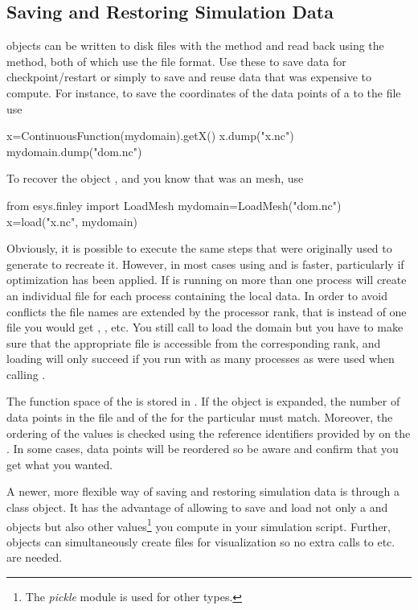 \subsection{Saving and Restoring Simulation Data}
\Data objects can be written to disk files with the  method and
read back using the  method, both of which use the
\netCDF\cite{NETCDF} file format.
Use these to save data for checkpoint/restart or simply to save and reuse data
that was expensive to compute.
For instance, to save the coordinates of the data points of a
\ContinuousFunction to the file  use
\begin{python}
  x=ContinuousFunction(mydomain).getX()
  x.dump("x.nc")
  mydomain.dump("dom.nc")
\end{python}
To recover the object , and you know that  was an \finley
mesh, use
\begin{python}
  from esys.finley import LoadMesh
  mydomain=LoadMesh("dom.nc")
  x=load("x.nc", mydomain)
\end{python}
Obviously, it is possible to execute the same steps that were originally used
to generate  to recreate it. However, in most cases using
 and  is faster, particularly if optimization has
been applied.
If \escript is running on more than one \MPI process  will create
an individual file for each process containing the local data.
In order to avoid conflicts the file names are extended by the \MPI processor
rank, that is instead of one file  you would get
, , etc. You still call
 to load the domain but you have to make sure that
the appropriate file is accessible from the corresponding rank, and loading
will only succeed if you run with as many processes as were used when calling
.

The function space of the \Data is stored in .
If the \Data object is expanded, the number of data points in the file and of
the \Domain for the particular \FunctionSpace must match.
Moreover, the ordering of the values is checked using the reference
identifiers provided by \FunctionSpace on the \Domain.
In some cases, data points will be reordered so be aware and confirm that you
get what you wanted.

A newer, more flexible way of saving and restoring \escript simulation data
is through a  class object.
It has the advantage of allowing to save and load not only a \Domain and
\Data objects but also other values\footnote{The \PYTHON \emph{pickle} module
is used for other types.} you compute in your simulation script.
Further,  objects can simultaneously create files for
visualization so no extra calls to  etc. are needed.

